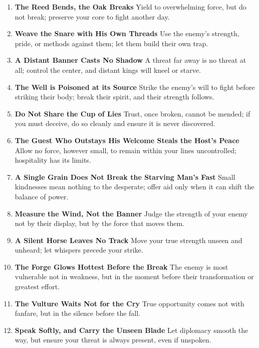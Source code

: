 \documentclass[11pt,letterpaper]{article}
\begin{document}
\begin{enumerate}
\item \textbf{The Reed Bends, the Oak Breaks}
Yield to overwhelming force, but do not break; preserve your core to fight another day.

\item \textbf{Weave the Snare with His Own Threads}
Use the enemy's strength, pride, or methods against them; let them build their own trap.

\item \textbf{A Distant Banner Casts No Shadow}
A threat far away is no threat at all; control the center, and distant kings will kneel or starve.

\item \textbf{The Well is Poisoned at its Source}
Strike the enemy's will to fight before striking their body; break their spirit, and their strength follows.

\item \textbf{Do Not Share the Cup of Lies}
Trust, once broken, cannot be mended; if you must deceive, do so cleanly and ensure it is never discovered.

\item \textbf{The Guest Who Outstays His Welcome Steals the Host's Peace}
Allow no force, however small, to remain within your lines uncontrolled; hospitality has its limits.

\item \textbf{A Single Grain Does Not Break the Starving Man's Fast}
Small kindnesses mean nothing to the desperate; offer aid only when it can shift the balance of power.

\item \textbf{Measure the Wind, Not the Banner}
Judge the strength of your enemy not by their display, but by the force that moves them.

\item \textbf{A Silent Horse Leaves No Track}
Move your true strength unseen and unheard; let whispers precede your strike.

\item \textbf{The Forge Glows Hottest Before the Break}
The enemy is most vulnerable not in weakness, but in the moment before their transformation or greatest effort.

\item \textbf{The Vulture Waits Not for the Cry}
True opportunity comes not with fanfare, but in the silence before the fall.

\item \textbf{Speak Softly, and Carry the Unseen Blade}
Let diplomacy smooth the way, but ensure your threat is always present, even if unspoken.


\end{enumerate}
\end{document}
